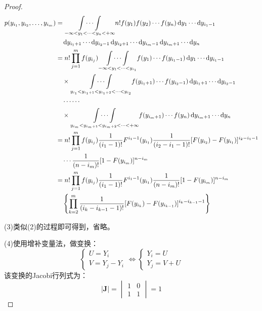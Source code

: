 \begin{proof}
	\begin{align*}
		p(y_{i_1},y_{i_2},\dots,y_{i_m})
		&=\underset{-\infty<y_1<\cdots<y_n<+\infty}{\int\cdots\int}n!f(y_1)f(y_2)\cdots f(y_n)\dif y_1\cdots\dif y_{i_1-1} \\
		&\quad\dif y_{i_1+1}\cdots\dif y_{i_2-1}\dif y_{i_2+1}\cdots\dif y_{i_m-1}\dif y_{i_m+1}\cdots\dif y_n \\
		&=n!\prod_{j=1}^{m}f(y_{i_j})\underset{-\infty<y_1<\cdots<y_{i_1}}{\int\cdots\int}f(y_1)\cdots f(y_{i_1-1})\dif y_1\cdots\dif y_{i_1-1} \\
		&\quad\times\underset{y_{i_1}<y_{i_1+1}<y_{i_1+2}<\cdots<y_{i_2}}{\int\cdots\int}f(y_{i_1+1})\cdots f(y_{i_2-1})\dif y_{i_1+1}\cdots\dif y_{i_2-1} \\
		&\quad\cdots\cdots \\
		&\quad\times\underset{y_{i_m}<y_{i_m+1}<y_{i_m+2}<\cdots<+\infty}{\int\cdots\int}f(y_{i_m+1})\cdots f(y_n)\dif y_{i_m+1}\cdots\dif y_n \\
		&=n!\prod_{j=1}^{m}f(y_{i_j})\frac{1}{(i_1-1)!}F^{i_1-1}(y_{i_1})\frac{1}{(i_2-i_1-1)!}[F(y_{i_2})-F(y_{i_1})]^{i_2-i_1-1} \\
		&\quad\cdots\frac{1}{(n-i_m)!}[1-F(y_{i_m})]^{n-i_m} \\
		&=n!\prod_{j=1}^{m}f(y_{i_j})\frac{1}{(i_1-1)!}F^{i_1-1}(y_{i_1})\frac{1}{(n-i_m)!}[1-F(y_{i_m})]^{n-i_m} \\
		&\quad\left\{\prod_{k=2}^{m}\frac{1}{(i_k-i_{k-1}-1)!}[F(y_{i_k})-F(y_{i_{k-1}})]^{i_k-i_{k-1}-1}\right\}
	\end{align*}\par
	(3)类似(2)的过程即可得到，省略。\par
	(4)使用增补变量法，做变换：
	\begin{equation*}
		\begin{cases}
			U=Y_i \\
			V=Y_j-Y_i
		\end{cases}
		\Leftrightarrow
		\begin{cases}
			Y_i=U \\
			Y_j=V+U
		\end{cases}
	\end{equation*}
	该变换的Jacobi行列式为：
	\begin{equation*}
		|\mathbf{J}|=
		\begin{vmatrix}
			1 & 0 \\
			1 & 1
		\end{vmatrix}
		=1
	\end{equation*}

\end{proof}
